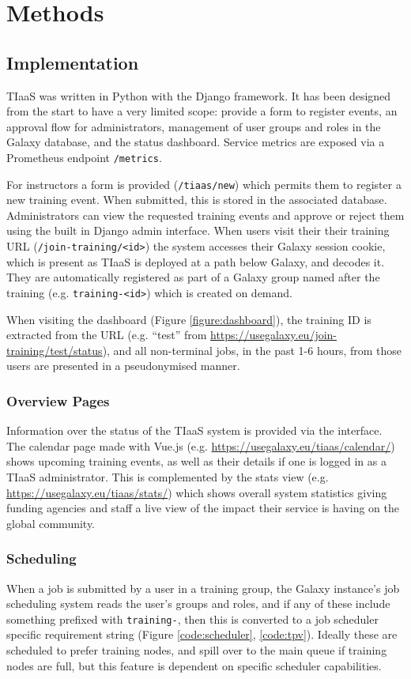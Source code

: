 \documentclass[a4paper,num-refs]{oup-contemporary}
\begin{document}
\section{Methods}

\subsection{Implementation}
TIaaS was written in Python with the Django framework. It has been designed from the start to have a very limited scope: provide a form to register events, an approval flow for administrators, management of user groups and roles in the Galaxy database, and the status dashboard. Service metrics are exposed via a Prometheus endpoint \texttt{/metrics}.

For instructors a form is provided (\texttt{/tiaas/new}) which permits them to register a new training event. When submitted, this is stored in the associated database. Administrators can view the requested training events and approve or reject them using the built in Django admin interface. When users visit their their training URL (\texttt{/join-training/<id>}) the system accesses their Galaxy session cookie, which is present as TIaaS is deployed at a path below Galaxy, and decodes it. They are automatically registered as part of a Galaxy group named after the training (e.g. \texttt{training-<id>}) which is created on demand.

When visiting the dashboard (Figure \ref{figure:dashboard}), the training ID is extracted from the URL (e.g. ``test'' from \url{https://usegalaxy.eu/join-training/test/status}), and all non-terminal jobs, in the past 1-6 hours, from those users are presented in a pseudonymised manner.

\subsubsection{Overview Pages}
Information over the status of the TIaaS system is provided via the interface. The calendar page made with Vue.js (e.g. \url{https://usegalaxy.eu/tiaas/calendar/}) shows upcoming training events, as well as their details if one is logged in as a TIaaS administrator. This is complemented by the stats view (e.g. \url{https://usegalaxy.eu/tiaas/stats/}) which shows overall system statistics giving funding agencies and staff a live view of the impact their service is having on the global community.

\subsubsection{Scheduling}
When a job is submitted by a user in a training group, the Galaxy instance's job scheduling system reads the user's groups and roles, and if any of these include something prefixed with \texttt{training-}, then this is converted to a job scheduler specific requirement string (Figure \ref{code:scheduler}, \ref{code:tpv}). Ideally these are scheduled to prefer training nodes, and spill over to the main queue if training nodes are full, but this feature is dependent on specific scheduler capabilities. 
\end{document}
